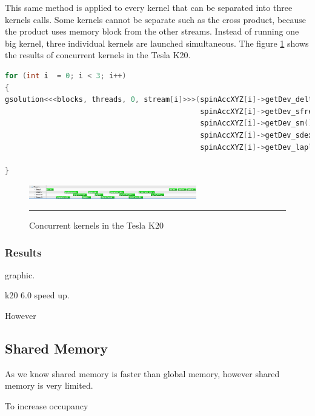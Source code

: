 This same method is applied to every kernel that can be separated into three kernels calls. Some kernels cannot be separate such as the cross product, because the product uses memory block from the other streams. Instead of running one big kernel, three individual kernels are launched simultaneous. The figure \ref{fig:concurrent} shows the results of concurrent kernels in the Tesla K20.

\begin{lstlisting}[language=C++, caption={Evaluation of individual coordinates of the Zhang and Li model}]
for (int i  = 0; i < 3; i++)
{
gsolution<<<blocks, threads, 0, stream[i]>>>(spinAccXYZ[i]->getDev_deltam(),
											 spinAccXYZ[i]->getDev_sfrelax(), 
											 spinAccXYZ[i]->getDev_sm(), 
											 spinAccXYZ[i]->getDev_sdex(),
											 spinAccXYZ[i]->getDev_lapl());

}
\end{lstlisting}


\begin{figure}[htbp]
	\centering
		\includegraphics[width=0.65\textwidth]{Figures/concurent.png}
		\rule{35em}{0.2pt}
	\caption[Streams kernels Tesla K20]{Concurrent kernels in the Tesla K20
}
	\label{fig:concurrent}
\end{figure}


\subsubsection{Results}

graphic.

k20  6.0 speed up.

However


\subsection{Shared Memory}

As we know shared memory is faster than global memory, however shared memory is very limited. 

To increase occupancy

\begin{lstlisting}[language=C++, caption={Evaluation of individual coordinates of the Zhang and Li model}]


\end{lstlisting}


